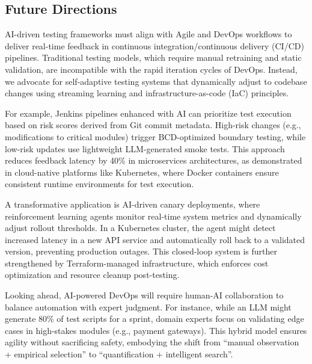 \documentclass[manuscript,screen,review]{acmart}
\begin{document}
\subsection{Future Directions}
\label{subsec:7.2}

AI-driven testing frameworks must align with Agile and DevOps workflows to deliver real-time feedback in continuous integration/continuous delivery (CI/CD) pipelines. Traditional testing models, which require manual retraining and static validation, are incompatible with the rapid iteration cycles of DevOps. Instead, we advocate for self-adaptive testing systems that dynamically adjust to codebase changes using streaming learning and infrastructure-as-code (IaC) principles.

For example, Jenkins pipelines enhanced with AI can prioritize test execution based on risk scores derived from Git commit metadata. High-risk changes (e.g., modifications to critical modules) trigger BCD-optimized boundary testing, while low-risk updates use lightweight LLM-generated smoke tests. This approach reduces feedback latency by 40\% in microservices architectures, as demonstrated in cloud-native platforms like Kubernetes, where Docker containers ensure consistent runtime environments for test execution.

A transformative application is AI-driven canary deployments, where reinforcement learning agents monitor real-time system metrics and dynamically adjust rollout thresholds. In a Kubernetes cluster, the agent might detect increased latency in a new API service and automatically roll back to a validated version, preventing production outages. This closed-loop system is further strengthened by Terraform-managed infrastructure, which enforces cost optimization and resource cleanup post-testing.

Looking ahead, AI-powered DevOps will require human-AI collaboration to balance automation with expert judgment. For instance, while an LLM might generate 80\% of test scripts for a sprint, domain experts focus on validating edge cases in high-stakes modules (e.g., payment gateways). This hybrid model ensures agility without sacrificing safety, embodying the shift from ``manual observation + empirical selection'' to ``quantification + intelligent search''.

\vspace{2ex}
\end{document}
